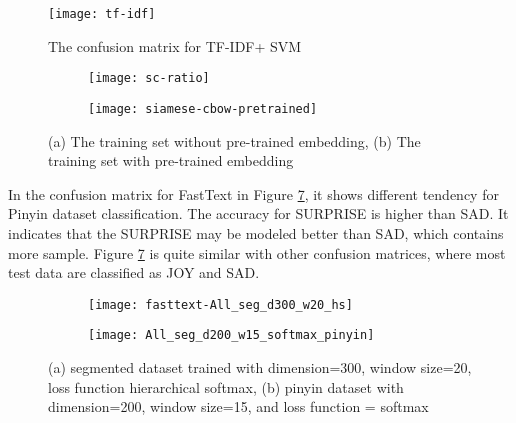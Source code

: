 \begin{figure}[h]
    \centering
	\texttt{[image: tf-idf]}
    \caption{The confusion matrix for TF-IDF+ SVM}
    \label{confusion1}
\end{figure}

\begin{figure}
\centering
\begin{subfigure}[b]{1\textwidth}
   \texttt{[image: sc-ratio]}
   \caption{}
   \label{confusion2} 
\end{subfigure}

\begin{subfigure}[b]{1\textwidth}
   \texttt{[image: siamese-cbow-pretrained]}
   \caption{}
   \label{confusion5}
\end{subfigure}
\caption[Confusion Matrix of Siamese-CBOW]{(a) The training set without pre-trained embedding,
(b) The training set with pre-trained embedding
}
\end{figure}


In the confusion matrix for FastText in Figure \ref{confusion4}, it shows different tendency for Pinyin dataset classification. 
The accuracy for SURPRISE is higher than SAD. It indicates that the SURPRISE may be modeled better than SAD, which contains more sample.
Figure \ref{confusion4} is quite similar with other confusion matrices, where most test data are classified as JOY and SAD.

\begin{figure}
\centering
\begin{subfigure}[b]{1\textwidth}
   \texttt{[image: fasttext-All\_seg\_d300\_w20\_hs]}
   \caption{}
   \label{confusion3} 
\end{subfigure}

\begin{subfigure}[b]{1\textwidth}
   \texttt{[image: All\_seg\_d200\_w15\_softmax\_pinyin]}
   \caption{}
   \label{confusion4}
\end{subfigure}
\caption[Confusion matrix of FastText]{(a) segmented dataset trained with dimension=300, window size=20, loss function hierarchical softmax,
(b) pinyin dataset with dimension=200, window size=15, and loss function = softmax
}
\end{figure}
